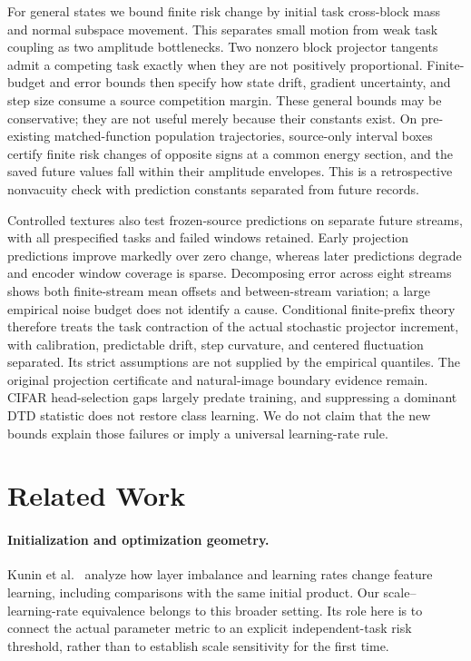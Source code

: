 For general states we bound finite risk change by initial task cross-block mass and normal subspace movement. This separates small motion from weak task coupling as two amplitude bottlenecks. Two nonzero block projector tangents admit a competing task exactly when they are not positively proportional. Finite-budget and error bounds then specify how state drift, gradient uncertainty, and step size consume a source competition margin. These general bounds may be conservative; they are not useful merely because their constants exist. On pre-existing matched-function population trajectories, source-only interval boxes certify finite risk changes of opposite signs at a common energy section, and the saved future values fall within their amplitude envelopes. This is a retrospective nonvacuity check with prediction constants separated from future records.

Controlled textures also test frozen-source predictions on separate future streams, with all prespecified tasks and failed windows retained. Early projection predictions improve markedly over zero change, whereas later predictions degrade and encoder window coverage is sparse. Decomposing error across eight streams shows both finite-stream mean offsets and between-stream variation; a large empirical noise budget does not identify a cause. Conditional finite-prefix theory therefore treats the task contraction of the actual stochastic projector increment, with calibration, predictable drift, step curvature, and centered fluctuation separated. Its strict assumptions are not supplied by the empirical quantiles. The original projection certificate and natural-image boundary evidence remain. CIFAR head-selection gaps largely predate training, and suppressing a dominant DTD statistic does not restore class learning. We do not claim that the new bounds explain those failures or imply a universal learning-rate rule.

\section{Related Work}
\paragraph{Initialization and optimization geometry.}
Kunin et al.~\cite{kunin2024rich} analyze how layer imbalance and learning rates change feature learning, including comparisons with the same initial product. Our scale--learning-rate equivalence belongs to this broader setting. Its role here is to connect the actual parameter metric to an explicit independent-task risk threshold, rather than to establish scale sensitivity for the first time.

